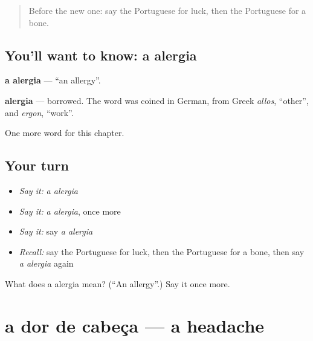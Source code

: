 \label{lesson:PT-C211-alergia}



\begin{quote}
Before the new one: say the Portuguese for luck, then the Portuguese for a bone.
\end{quote}

\subsection*{You'll want to know: a alergia}
\textbf{a alergia} — \textquotedblleft{}an allergy\textquotedblright{}.

\begin{cousinweb}
\textbf{alergia} — borrowed. The word was coined in German, from Greek \emph{allos}, \textquotedblleft{}other\textquotedblright{}, and \emph{ergon}, \textquotedblleft{}work\textquotedblright{}.
\end{cousinweb}

\begin{grammarlens}[title={What you've built}]
One more word for this chapter.
\end{grammarlens}

\subsection*{Your turn}
\begin{itemize}
\raggedright
  \item \emph{Say it:} \emph{a alergia}
  \item \emph{Say it:} \emph{a alergia}, once more
  \item \emph{Say it:} say \emph{a alergia}
  \item \emph{Recall:} say the Portuguese for luck, then the Portuguese for a bone, then say \emph{a alergia} again
\end{itemize}

\begin{tcolorbox}[breakable,colback=teal!4,colframe=teal!35!black,title={Before you move on}]
What does a alergia mean? (\textquotedblleft{}An allergy\textquotedblright{}.) Say it once more.
\end{tcolorbox}
\section[a dor de cabeça]{a dor de cabeça — a headache}

\label{lesson:PT-C211-dor-de-cabeca}



